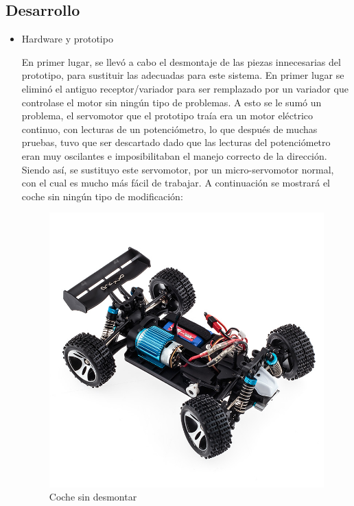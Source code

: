\documentclass{pclass}
\begin{document}
 
\subsection{Desarrollo}

\begin{itemize}

\item Hardware y prototipo

En primer lugar, se llevó a cabo el desmontaje de las piezas innecesarias del prototipo, para sustituir las adecuadas para este sistema. En primer lugar se eliminó el antiguo receptor/variador para ser remplazado por un variador que controlase el motor sin ningún tipo de problemas. A esto se le sumó un problema, el servomotor que el prototipo traía era un motor eléctrico continuo, con lecturas de un potenciómetro, lo que después de muchas pruebas, tuvo que ser descartado dado que las lecturas del potenciómetro eran muy oscilantes e imposibilitaban el manejo correcto de la dirección. Siendo así, se sustituyo este servomotor, por un micro-servomotor normal, con el cual es mucho más fácil de trabajar.
A continuación se mostrará el coche sin ningún tipo de modificación:

\begin{figure}[H]
  \centering
    \includegraphics[width=1\textwidth]{img/A959}
  \caption{Coche sin desmontar}
  \label{fig:CocheSin}
\end{figure}


\end{itemize}
\end{document}
